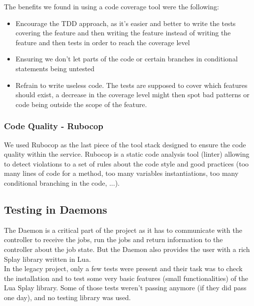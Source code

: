 \documentclass{eplmastersthesis}
\begin{document}
          The benefits we found in using a code coverage tool were the
          following:

          \begin{itemize}
            \item Encourage the TDD approach, as it's easier and better to
            write the tests covering the feature and then writing the feature
            instead of writing the feature and then tests in order to reach
            the coverage level
            \item Ensuring we don't let parts of the code or certain branches
            in conditional statements being untested
            \item Refrain to write useless code. The tests are supposed to cover
            which features should exist, a decrease in the coverage level
            might then spot bad patterns or code being outside the scope
            of the feature.
          \end{itemize}

        \subsubsection{Code Quality - Rubocop}

          We used Rubocop as the last piece of the tool stack designed to ensure
          the code quality within the service. Rubocop is a static code analysis
          tool (linter) allowing to detect violations to a set of rules about
          the code style and good practices (too many lines of code for a method,
          too many variables instantiations, too many conditional branching
          in the code, ...).

      \subsection{Testing in Daemons}

        The Daemon is a critical part of the project as it has to communicate
        with the controller to receive the jobs, run the jobs and return
        information to the controller about the job state. But the Daemon also
        provides the user with a rich Splay library written in Lua.\\
        In the legacy project, only a few tests were present and their
        task was to check the installation and to test some very basic features
        (small functionalities) of the Lua Splay library. Some of those tests
        weren't passing anymore (if they did pass one day), and no testing
        library was used.\\
\end{document}
